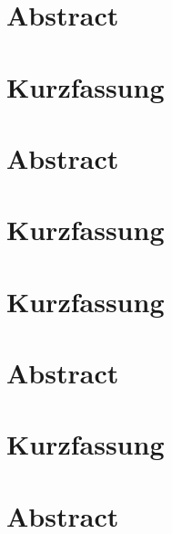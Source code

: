 %
{%
  \section*{Abstract}
  
  \clearpage

  \section*{Kurzfassung}
  \begin{otherlanguage}{ngerman}
    
  \end{otherlanguage}
}{}


%
{%
  \section*{Abstract}
  
  \clearpage

  \section*{Kurzfassung}
  \begin{otherlanguage}{ngerman}
    
  \end{otherlanguage}
}{}


%
{%
  \section*{Kurzfassung}
  
  \clearpage

  \section*{Abstract}
  \begin{otherlanguage}{english}
    
  \end{otherlanguage}
}{}


%
{%
  \section*{Kurzfassung}
  
  \clearpage

  \section*{Abstract}
  \begin{otherlanguage}{english}
    
  \end{otherlanguage}
}{}

